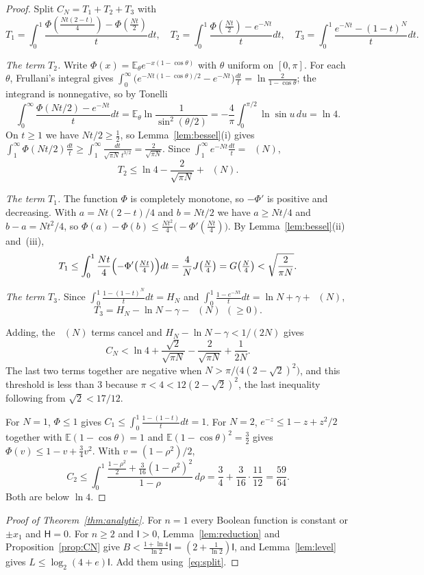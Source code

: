 \documentclass[11pt]{amsart}
\theoremstyle{definition}
\theoremstyle{remark}
\newcommand{\E}{\mathbb E}
\newcommand{\HH}{\mathsf H}
\newcommand{\I}{\mathsf I}
\DeclareMathOperator{\Ei}{E_1}
\begin{document}
\begin{proof}
Split $C_N=T_1+T_2+T_3$ with
\[
 T_1=\int_0^1\frac{\Phi(\frac{Nt(2-t)}4)-\Phi(\frac{Nt}2)}{t}dt,\quad
 T_2=\int_0^1\frac{\Phi(\frac{Nt}2)-e^{-Nt}}{t}dt,\quad
 T_3=\int_0^1\frac{e^{-Nt}-(1-t)^N}{t}dt.
\]

\emph{The term $T_2$.} Write $\Phi(x)=\E_\theta e^{-x(1-\cos\theta)}$ with $\theta$ uniform on $[0,\pi]$. For each $\theta$, Frullani's integral gives $\int_0^\infty\bigl(e^{-Nt(1-\cos\theta)/2}-e^{-Nt}\bigr)\frac{dt}t=\ln\frac2{1-\cos\theta}$; the integrand is nonnegative, so by Tonelli
\[
 \int_0^\infty\frac{\Phi(Nt/2)-e^{-Nt}}{t}dt=\E_\theta\ln\frac{1}{\sin^2(\theta/2)}=-\frac4\pi\int_0^{\pi/2}\ln\sin u\,du=\ln4.
\]
On $t\ge1$ we have $Nt/2\ge\tfrac12$, so Lemma~\ref{lem:bessel}(i) gives $\int_1^\infty\Phi(Nt/2)\frac{dt}t\ge\int_1^\infty\frac{dt}{\sqrt{\pi N}\,t^{3/2}}=\frac2{\sqrt{\pi N}}$. Since $\int_1^\infty e^{-Nt}\frac{dt}t=\Ei(N)$,
\[
 T_2\le\ln4-\frac2{\sqrt{\pi N}}+\Ei(N).
\]

\emph{The term $T_1$.} The function $\Phi$ is completely monotone, so $-\Phi'$ is positive and decreasing. With $a=Nt(2-t)/4$ and $b=Nt/2$ we have $a\ge Nt/4$ and $b-a=Nt^2/4$, so $\Phi(a)-\Phi(b)\le\frac{Nt^2}4\bigl(-\Phi'(\frac{Nt}4)\bigr)$. By Lemma~\ref{lem:bessel}(ii) and~(iii),
\[
 T_1\le\int_0^1\frac{Nt}4\Bigl(-\Phi'\bigl(\tfrac{Nt}4\bigr)\Bigr)dt=\frac4NJ\bigl(\tfrac N4\bigr)=G\bigl(\tfrac N4\bigr)<\sqrt{\frac{2}{\pi N}}.
\]

\emph{The term $T_3$.} Since $\int_0^1\frac{1-(1-t)^N}{t}dt=H_N$ and $\int_0^1\frac{1-e^{-Nt}}tdt=\ln N+\gamma+\Ei(N)$,
\[
 T_3=H_N-\ln N-\gamma-\Ei(N)\ \ (\ge0).
\]

Adding, the $\Ei(N)$ terms cancel and $H_N-\ln N-\gamma<1/(2N)$ gives
\[
 C_N<\ln4+\frac{\sqrt2}{\sqrt{\pi N}}-\frac{2}{\sqrt{\pi N}}+\frac1{2N}.
\]
The last two terms together are negative when $N>\pi/\bigl(4(2-\sqrt2)^2\bigr)$, and this threshold is less than $3$ because $\pi<4<12(2-\sqrt2)^2$, the last inequality following from $\sqrt2<17/12$.

For $N=1$, $\Phi\le1$ gives $C_1\le\int_0^1\frac{1-(1-t)}tdt=1$. For $N=2$, $e^{-z}\le1-z+z^2/2$ together with $\E(1-\cos\theta)=1$ and $\E(1-\cos\theta)^2=\tfrac32$ gives $\Phi(v)\le1-v+\tfrac34v^2$. With $v=(1-\rho^2)/2$,
\[
 C_2\le\int_0^1\frac{\frac{1-\rho^2}2+\frac3{16}(1-\rho^2)^2}{1-\rho}\,d\rho=\frac34+\frac3{16}\cdot\frac{11}{12}=\frac{59}{64}.
\]
Both are below $\ln4$.
\end{proof}

\begin{proof}[Proof of Theorem~\ref{thm:analytic}]
For $n=1$ every Boolean function is constant or $\pm x_1$ and $\HH=0$. For $n\ge2$ and $\I>0$, Lemma~\ref{lem:reduction} and Proposition~\ref{prop:CN} give $B<\frac{1+\ln4}{\ln2}\I=(2+\frac1{\ln2})\I$, and Lemma~\ref{lem:level} gives $L\le\log_2(4+e)\I$. Add them using~\eqref{eq:split}.
\end{proof}
\end{document}
